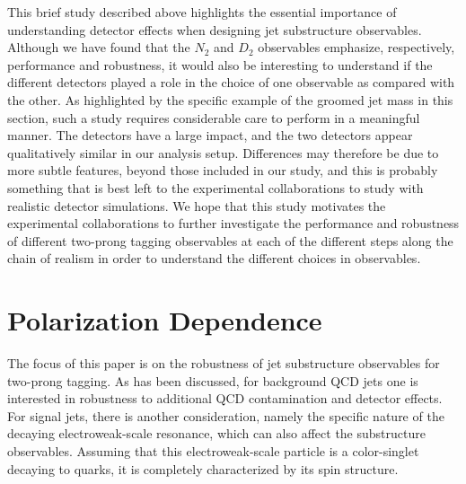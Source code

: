 \documentclass[11pt]{cernrep}
\begin{document}
This brief study described above highlights the essential importance
of understanding detector effects when designing jet substructure
observables.
%
Although we have found that the $N_2$ and $D_2$ observables emphasize,
respectively, performance and robustness, it would also be interesting
to understand if the different detectors played a role in the choice
of one observable as compared with the other.
%
As highlighted by the specific example of the groomed jet mass in this section, such a study requires considerable care to perform in a meaningful manner.
%
The detectors have a large impact, and the two detectors appear qualitatively similar in our analysis setup.
%
Differences may therefore be due to more subtle features, beyond those included in our study, and this is probably something that is best left to the experimental collaborations to study with realistic detector simulations.
%
We hope that this study motivates the experimental collaborations to further investigate the performance and robustness of different two-prong tagging observables at each of the different steps along the chain of realism in order to understand the different choices in observables.



\section{Polarization Dependence}\label{jetsub_2prong_sec:polar}

The focus of this paper is on the robustness of jet substructure
observables for two-prong tagging.
%
As has been discussed, for
background QCD jets one is interested in robustness to additional QCD
contamination and detector effects.
%
For signal jets, there is another consideration, namely the specific nature of the decaying electroweak-scale resonance, which can also affect the substructure observables.
%
Assuming that this electroweak-scale particle is a color-singlet decaying to quarks, it is completely
characterized by its spin structure.
\end{document}
